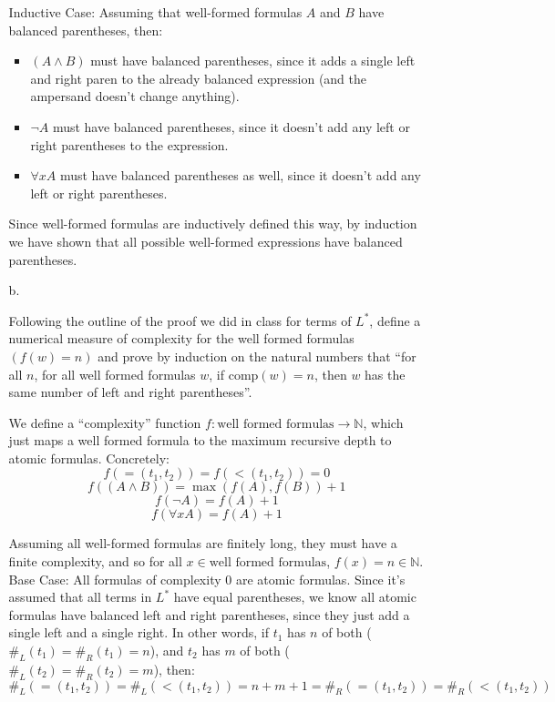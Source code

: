 \begin{enumerate}
\begin{enumerate}
        Inductive Case: Assuming that well-formed formulas $A$ and $B$ have balanced parentheses, then:\\
        \begin{itemize}
          \item $(A \land B)$ must have balanced parentheses, since it adds a single left and right paren to the already balanced expression (and the ampersand doesn't change anything).
          \item $\neg A$ must have balanced parentheses, since it doesn't add any left or right parentheses to the expression.
          \item $\forall x A$ must have balanced parentheses as well, since it doesn't add any left or right parentheses.
        \end{itemize}

         Since well-formed formulas are inductively defined this way, by induction we have shown that all possible well-formed expressions have balanced parentheses.
        
      \item [b.]
        \begin{question}
          Following the outline of the proof we did in class for terms of $L^*$, define a numerical measure of complexity for the well formed formulas $(f(w) = n)$ and prove by induction on the natural numbers that ``for all $n$, for all well formed formulas $w$, if $\text{comp}(w) = n$, then $w$ has the same number of left and right parentheses''.\\
        \end{question}

        We define a ``complexity'' function $f: \text{well formed formulas} \rightarrow \mathds{N}$, which just maps a well formed formula to the maximum recursive depth to atomic formulas. Concretely:
        $$f(=(t_1,t_2)) = f(<(t_1,t_2)) = 0$$ 
        $$f((A \land B)) = \max(f(A), f(B)) + 1$$
        $$f(\neg A) = f(A) + 1$$
        $$f(\forall x A) = f(A) + 1$$

        Assuming all well-formed formulas are finitely long, they must have a finite complexity, and so for all $x \in \text{well formed formulas}$, $f(x) = n \in \mathds{N}$.\\

        Base Case: All formulas of complexity 0 are atomic formulas. Since it's assumed that all terms in $L^*$ have equal parentheses, we know all atomic formulas have balanced left and right parentheses, since they just add a single left and a single right. In other words, if $t_1$ has $n$ of both ($\#_L(t_1) = \#_R(t_1) = n$), and $t_2$ has $m$ of both ($\#_L(t_2) = \#_R(t_2) = m$), then:
        $$\#_L(=(t_1,t_2)) = \#_L(<(t_1,t_2)) = n + m + 1 = \#_R(=(t_1,t_2)) = \#_R(<(t_1,t_2))$$


\end{enumerate}
\end{enumerate}
